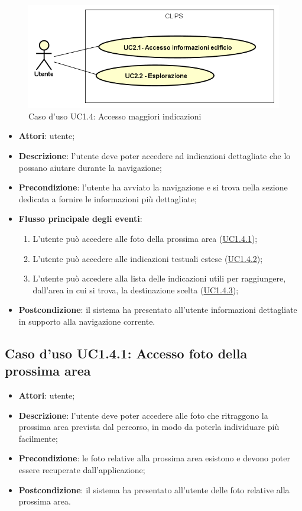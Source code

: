 \documentclass[../AnalisiDeiRequisiti.tex]{subfiles}
\begin{document}
        \begin{figure}[!h]
            \centering
            \includegraphics[scale=0.95, width=\textwidth]{img/UC1-4.png}
            \caption{Caso d'uso UC1.4: Accesso maggiori indicazioni}\label{fig:UC1.4} 
        \end{figure}
\begin{itemize}
\item \textbf{Attori}: utente;
\item \textbf{Descrizione}: l'utente deve poter accedere ad indicazioni dettagliate che lo possano aiutare durante la navigazione; 
      \item \textbf{Precondizione}: l'utente ha avviato la navigazione e si trova nella sezione dedicata a fornire le informazioni più dettagliate;

        \item \textbf{Flusso principale degli eventi}:
          \begin{enumerate}
          \item L'utente può accedere alle foto della prossima area (\hyperlink{UC1.4.1}{UC1.4.1});
          \item L'utente può accedere alle indicazioni testuali estese (\hyperlink{UC1.4.2}{UC1.4.2});
          \item L'utente può accedere alla lista delle indicazioni utili per raggiungere, dall'area in cui si trova, la destinazione scelta (\hyperlink{UC1.4.3}{UC1.4.3});

      \end{enumerate}
    \item \textbf{Postcondizione}: il sistema ha presentato all'utente informazioni dettagliate in supporto alla navigazione corrente.
  \end{itemize}
\hypertarget{UC1.4.1}{}
\subsection{Caso d'uso UC1.4.1: Accesso foto della prossima area}
\begin{itemize}
\item \textbf{Attori}: utente;
\item \textbf{Descrizione}: l'utente deve poter accedere alle foto che ritraggono la prossima area prevista dal percorso, in modo da poterla individuare più facilmente; 
      \item \textbf{Precondizione}: le foto relative alla prossima area esistono e devono poter essere recuperate dall'applicazione;
    \item \textbf{Postcondizione}: il sistema ha presentato all'utente delle foto relative alla prossima area.
  \end{itemize}
\hypertarget{UC1.4.2}{}
\end{document}
